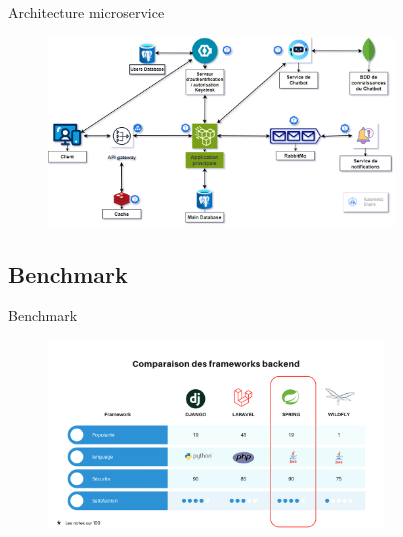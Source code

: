 \documentclass{beamer}
\begin{document}
\begin{frame}{Architecture microservice}
   \begin{figure}[htpb]
        \centering
        \includegraphics[height=5cm]{pic/Code212_architecture.drawio (1).png}
    \end{figure}
\end{frame}


\subsection{Benchmark}
\begin{frame}{Benchmark}
   \begin{figure}[htpb]
        \centering
        \includegraphics[height=5cm]{pic/benchmark.png}
    \end{figure}
\end{frame}
\end{document}
